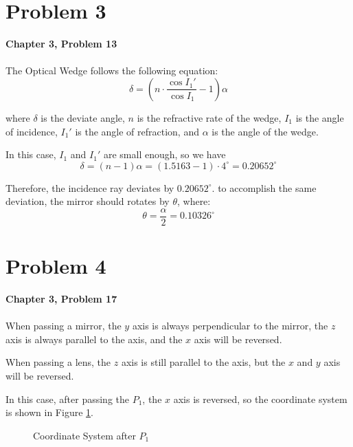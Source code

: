\documentclass{article}
\begin{document}
\section{Problem 3}
\textbf{Chapter 3, Problem 13}\\\\

The Optical Wedge follows the following equation:
\begin{equation}
    \delta = \left(n\cdot\frac{\cos{I_1'}}{\cos{I_1}} - 1\right)\alpha
\end{equation}

where $\delta$ is the deviate angle, $n$ is the refractive rate of the wedge, $I_1$ is the angle of incidence, $I_1'$ is the angle of refraction, and $\alpha$ is the angle of the wedge.

In this case, $I_1$ and $I_1'$ are small enough, so we have
\begin{equation}
    \delta = (n-1)\alpha = (1.5163-1)\cdot 4^{\circ} = 0.20652^{\circ}
\end{equation}

Therefore, the incidence ray deviates by $\mathbf{0.20652^{\circ}}$. to accomplish the same deviation, the mirror should  rotates by $\theta$, where:
\begin{equation}
    \boxed{
        \theta = \frac{\alpha}{2} = 0.10326^{\circ}
    }
\end{equation}

\section{Problem 4}
\textbf{Chapter 3, Problem 17}\\\\

When passing a mirror, the $y$ axis is always perpendicular to the mirror, the $z$ axis is always parallel to the axis, and the $x$ axis will be reversed.

When passing a lens, the $z$ axis is still parallel to the axis, but the $x$ and $y$ axis will be reversed.


In this case, after passing the $P_1$, the $x$ axis is reversed, so the coordinate system is shown in Figure \ref{fig:3-17-1}.

\begin{figure}[H]
    \centering
    \caption{Coordinate System after $P_1$}
    \label{fig:3-17-1}
\end{figure}
\end{document}
